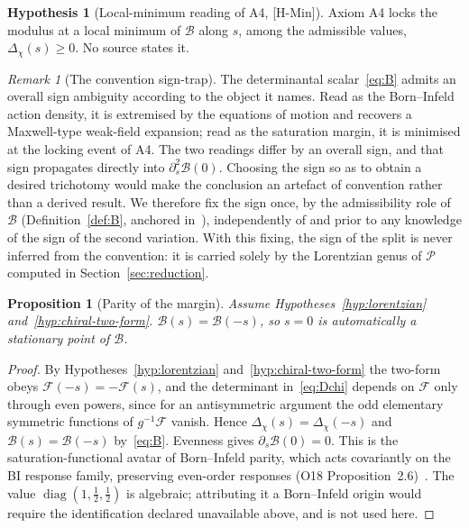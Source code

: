 \documentclass[11pt]{article}
\newtheorem{proposition}{Proposition}
\theoremstyle{definition}
\newtheorem{hypothesis}{Hypothesis}
\theoremstyle{remark}
\newtheorem{remark}{Remark}
\newcommand{\Fchi}{\mathcal{F}}
\newcommand{\Pchi}{\mathcal{P}}
\newcommand{\Bsat}{\mathcal{B}}
\newcommand{\Dchi}{\Delta_{\chi}}
\newcommand{\diag}{\operatorname{diag}}
\begin{document}
    \begin{hypothesis}[Local-minimum reading of A4, {[H-Min]}]
      \label{hyp:local-min}
      Axiom A4 locks the modulus at a local minimum of $\Bsat$ along $s$, among the admissible values,
      $\Dchi(s)\ge0$.
      No source states it.
    \end{hypothesis}

    \begin{remark}[The convention sign-trap]
      \label{rem:trap}
      The determinantal scalar~\eqref{eq:B} admits an overall sign ambiguity according to the object it names.
      Read as the Born--Infeld action density, it is extremised by the equations of motion and recovers a Maxwell-type
      weak-field expansion; read as the saturation margin, it is minimised at the locking event of A4.
      The two readings differ by an overall sign, and that sign propagates directly into $\partial_s^2 \Bsat(0)$.
      Choosing the sign so as to obtain a desired trichotomy would make the conclusion an artefact of convention rather than a
      derived result.
      We therefore fix the sign once, by the admissibility role of $\Bsat$ (Definition~\ref{def:B}, anchored
      in~\cite{Beau2026a26, Beau2026m}), independently of and prior to any knowledge of the sign of the second variation.
      With this fixing, the sign of the split is never inferred from the convention: it is carried solely by the Lorentzian
      genus of $\Pchi$ computed in Section~\ref{sec:reduction}.
    \end{remark}

    \begin{proposition}[Parity of the margin]
      \label{prop:parity}
      Assume Hypotheses~\ref{hyp:lorentzian} and~\ref{hyp:chiral-two-form}.
      $\Bsat(s) = \Bsat(-s)$, so $s = 0$ is automatically a stationary point of $\Bsat$.
    \end{proposition}

    \begin{proof}
      By Hypotheses~\ref{hyp:lorentzian} and~\ref{hyp:chiral-two-form} the two-form obeys $\Fchi(-s) = -\Fchi(s)$, and
      the determinant
      in~\eqref{eq:Dchi}
      depends on $\Fchi$ only through even powers, since for an antisymmetric argument the odd elementary symmetric functions
      of
      $g^{-1}\Fchi$ vanish.
      Hence $\Dchi(s) = \Dchi(-s)$ and $\Bsat(s) = \Bsat(-s)$ by~\eqref{eq:B}.
      Evenness gives $\partial_s \Bsat(0) = 0$.
      This is the saturation-functional avatar of Born--Infeld parity, which acts covariantly
      on the BI response family, preserving even-order responses
      (O18 Proposition~2.6)~\cite{Beau2026a22}.
      The value $\diag(1, \tfrac12, \tfrac12)$ is algebraic; attributing it a Born--Infeld origin
      would require the identification declared unavailable above, and is not used here.
    \end{proof}
\end{document}
